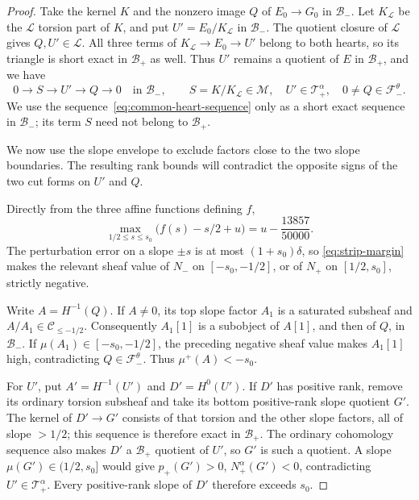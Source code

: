 \begin{proof}
Take the kernel $K$ and the nonzero image $Q$ of $E_0\to G_0$ in
$\mathcal B_-$.  Let $K_{\mathcal L}$ be the $\mathcal L$ torsion
part of $K$, and put $U'=E_0/K_{\mathcal L}$ in $\mathcal B_-$.
The quotient closure of $\mathcal L$ gives $Q,U'\in\mathcal L$.
All three terms of
$K_{\mathcal L}\to E_0\to U'$ belong to both hearts, so its triangle
is short exact in $\mathcal B_+$ as well.  Thus $U'$ remains a
quotient of $E$ in $\mathcal B_+$, and we have
\begin{equation}\label{eq:common-heart-sequence}
 0\longrightarrow S\longrightarrow U'\longrightarrow Q\longrightarrow0
 \quad\text{in }\mathcal B_-,\qquad
 S=K/K_{\mathcal L}\in\mathcal M,
 \quad U'\in\mathcal T_+^\alpha,
 \quad 0\ne Q\in\mathcal F_-^\theta.
\end{equation}
We use the sequence~\eqref{eq:common-heart-sequence} only as a short exact
sequence in $\mathcal B_-$; its term $S$
need not belong to $\mathcal B_+$.

We now use the slope envelope to exclude factors close to the two slope
boundaries. The resulting rank bounds will contradict the opposite signs of
the two cut forms on $U'$ and $Q$.

Directly from the three affine functions defining $f$,
\begin{equation}\label{eq:strip-test}
 \max_{1/2\leq s\leq s_0}\bigl(f(s)-s/2+u\bigr)
                 =u-\frac{13857}{50000}.
\end{equation}
The perturbation error on a slope $\pm s$ is at most
$(1+s_0)\delta$, so \eqref{eq:strip-margin} makes the relevant
sheaf value of $N_-$ on $[-s_0,-1/2]$, or of $N_+$ on
$[1/2,s_0]$, strictly negative.

Write $A=H^{-1}(Q)$.  If $A\ne0$, its top slope factor $A_1$
is a saturated subsheaf and $A/A_1\in\mathcal C_{\leq-1/2}$.
Consequently $A_1[1]$ is a subobject of $A[1]$, and then of $Q$, in
$\mathcal B_-$.  If $\mu(A_1)\in[-s_0,-1/2]$, the preceding
negative sheaf value makes $A_1[1]$ high, contradicting
$Q\in\mathcal F_-^\theta$.  Thus $\mu^+(A)<-s_0$.

For $U'$, put $A'=H^{-1}(U')$ and $D'=H^0(U')$.
If $D'$ has positive rank, remove its ordinary torsion subsheaf and
take its bottom positive-rank slope quotient $G'$.  The kernel of
$D'\to G'$ consists of that torsion and the other slope factors,
all of slope $>1/2$; this sequence is therefore exact in
$\mathcal B_+$.  The ordinary cohomology sequence also makes $D'$
a $\mathcal B_+$ quotient of $U'$, so $G'$ is such a quotient.
A slope $\mu(G')\in(1/2,s_0]$ would give
$p_+(G')>0$, $N_+^\alpha(G')<0$, contradicting
$U'\in\mathcal T_+^\alpha$.  Every positive-rank slope of $D'$
therefore exceeds $s_0$.


\end{proof}
